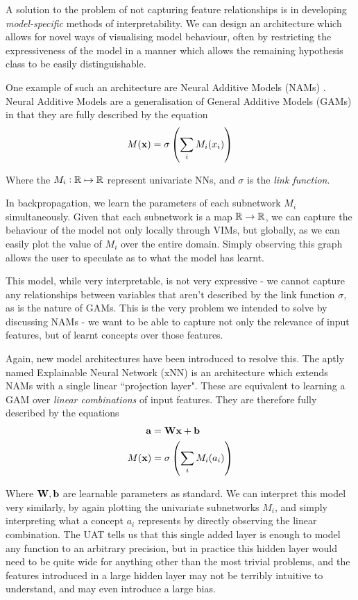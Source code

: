 A solution to the problem of not capturing feature relationships is in developing \textit{model-specific} methods of interpretability. We can design an architecture which allows for novel ways of visualising model behaviour, often by restricting the expressiveness of the model in a manner which allows the remaining hypothesis class to be easily distinguishable. 

One example of such an architecture are Neural Additive Models (NAMs) \cite{neuraladditive}. Neural Additive Models are a generalisation of General Additive Models (GAMs) in that they are fully described by the equation
$$M(\mathbf{x}) = \sigma\left(\sum_i M_i(x_i)\right)$$

Where the $M_i:\mathbb{R} \mapsto \mathbb{R}$ represent univariate NNs, and $\sigma$ is the \textit{link function}.

In backpropagation, we learn the parameters of each subnetwork $M_i$ simultaneously. Given that each subnetwork is a map $\mathbb{R} \to \mathbb{R}$, we can capture the behaviour of the model not only locally through VIMs, but globally, as we can easily plot the value of $M_i$ over the entire domain. Simply observing this graph allows the user to speculate as to what the model has learnt.

This model, while very interpretable, is not very expressive - we cannot capture any relationships between variables that aren't described by the link function $\sigma$, as is the nature of GAMs. This is the very problem we intended to solve by discussing NAMs - we want to be able to capture not only the relevance of input features, but of learnt concepts over those features.

Again, new model architectures have been introduced to resolve this. The aptly named Explainable Neural Network (xNN) \cite{xnn} is an architecture which extends NAMs with a single linear ``projection layer". These are equivalent to learning a GAM over \textit{linear combinations} of input features. They are therefore fully described by the equations
$$
\begin{aligned}
\mathbf{a} &= \mathbf{W}\mathbf{x} + \mathbf{b}\\
M(\mathbf{x}) &= \sigma\left(\sum_i M_i(a_i)\right)
\end{aligned}
$$

Where $\mathbf{W}, \mathbf{b}$ are learnable parameters as standard. We can interpret this model very similarly, by again plotting the univariate subnetworks $M_i$, and simply interpreting what a concept $a_i$ represents by directly observing the linear combination. The UAT tells us that this single added layer is enough to model any function to an arbitrary precision, but in practice this hidden layer would need to be quite wide for anything other than the most trivial problems, and the features introduced in a large hidden layer may not be terribly intuitive to understand, and may even introduce a large bias.

